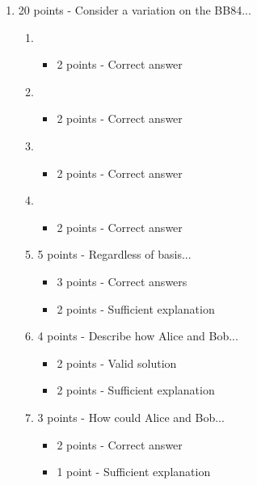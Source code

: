 \documentclass[12pt]{article}
\begin{document}
\begin{enumerate}[font=\bfseries]
\begin{itemize}
        \end{itemize}
    \item 20 points - Consider a variation on the BB84...
        \begin{enumerate}
            \item \begin{itemize}
                \item 2 points - Correct answer
            \end{itemize}
            \item \begin{itemize}
                \item 2 points - Correct answer
            \end{itemize}
            \item \begin{itemize}
                \item 2 points - Correct answer
            \end{itemize}
            \item \begin{itemize}
                \item 2 points - Correct answer
            \end{itemize}
            \item 5 points - Regardless of basis...
            \begin{itemize}
                \item 3 points - Correct answers
                \item 2 points - Sufficient explanation
            \end{itemize}
            \item 4 points - Describe how Alice and Bob...
            \begin{itemize}
                \item 2 points - Valid solution
                \item 2 points - Sufficient explanation
            \end{itemize}
            \item 3 points - How could Alice and Bob...
            \begin{itemize}
                \item 2 points - Correct answer
                \item 1 point - Sufficient explanation
            \end{itemize}
        \end{enumerate}

\end{enumerate}
\end{document}

